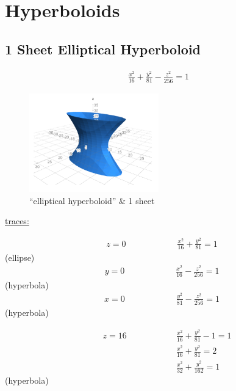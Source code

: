 \documentclass{article}
\begin{document}
\section{Hyperboloids}

\subsection{1 Sheet Elliptical Hyperboloid}
\begin{align*}
  \frac{x^2}{16}+\frac{y^2}{81}-\frac{z^2}{256}=1
\end{align*}
\begin{figure}
  \includegraphics[width=0.5\textwidth]{hyperboloid1.png}
  \caption{``elliptical hyperboloid'' \& 1 sheet}
  \label{fig:hypberola1}
\end{figure}
\begin{flushleft}
  \underline{traces:}
\end{flushleft}
\begin{align*}
  &z=0\qquad\qquad\qquad\frac{x^2}{16}+\frac{y^2}{81}=1
\end{align*}
\hspace{5.85cm}(ellipse)
\begin{align*}
  &y=0\qquad\qquad\qquad\frac{x^2}{16}-\frac{z^2}{256}=1
\end{align*}
\hspace{5.85cm}(hyperbola)
\newpage
\begin{align*}
  &x=0\qquad\qquad\qquad\frac{y^2}{81}-\frac{z^2}{256}=1
\end{align*}
\hspace{5.75cm}(hyperbola)
\begin{flushleft}
  \begin{align*}
    \qquad z=16\quad\qquad\qquad&\frac{x^2}{16}+\frac{y^2}{81}-1=1\\
    &\frac{x^2}{16}+\frac{y^2}{81}=2\\
    &\frac{x^2}{32}+\frac{y^2}{162}=1
  \end{align*}
  \hspace{5.75cm}(hyperbola)
\end{flushleft}
\end{document}
